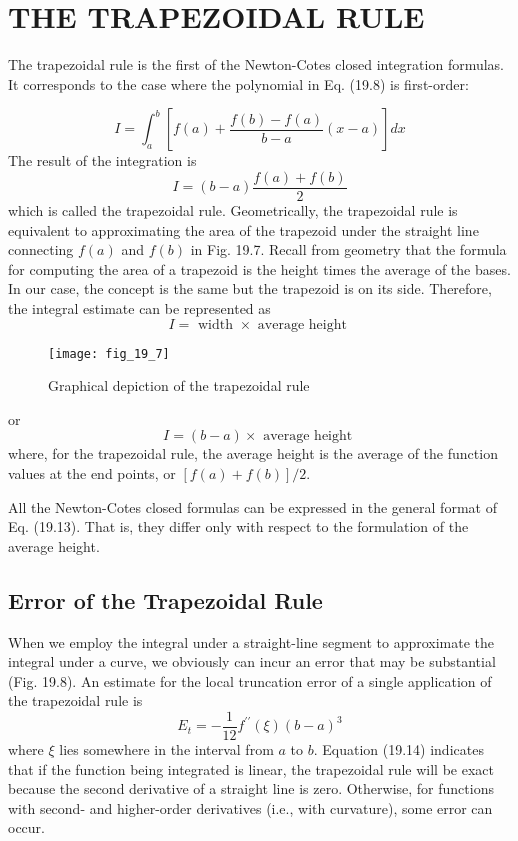 \documentclass[../main.tex]{subfiles}
\begin{document}
\section{THE TRAPEZOIDAL RULE}

The trapezoidal rule is the first of the Newton-Cotes closed integration formulas. It corresponds to the case where the polynomial in Eq. (19.8) is first-order:

\begin{equation}
    \tag{19.10}
I=\int_{a}^{b}\left[f(a)+\frac{f(b)-f(a)}{b-a}(x-a)\right] d x
\end{equation}
The result of the integration is
\begin{equation}
    \tag{19.11}
I=(b-a) \frac{f(a)+f(b)}{2}
\end{equation}
which is called the trapezoidal rule.
Geometrically, the trapezoidal rule is equivalent to approximating the area of the trapezoid under the straight line connecting $f(a)$ and $f(b)$ in Fig. 19.7. Recall from geometry that the formula for computing the area of a trapezoid is the height times the average of the bases. In our case, the concept is the same but the trapezoid is on its side. Therefore, the integral estimate can be represented as
\begin{equation}
    \tag{19.12}
I=\text { width } \times \text { average height }
\end{equation}

\begin{figure}[H]
    \centering
    \texttt{[image: fig\_19\_7]}
   \caption{\textsf{Graphical depiction of the trapezoidal rule}}\label{fig:fig_19_7}
\end{figure}
or
\begin{equation}
    \tag{19.13}
	I=(b-a) \times \text { average height }
\end{equation}
where, for the trapezoidal rule, the average height is the average of the function values at the end points, or $[f(a)+f(b)] / 2$.

All the Newton-Cotes closed formulas can be expressed in the general format of Eq. (19.13). That is, they differ only with respect to the formulation of the average height.
\subsection{Error of the Trapezoidal Rule}
When we employ the integral under a straight-line segment to approximate the integral under a curve, we obviously can incur an error that may be substantial (Fig. 19.8). An estimate for the local truncation error of a single application of the trapezoidal rule is
\begin{equation}
    \tag{19.14}
E_{t}=-\frac{1}{12} f^{\prime \prime}(\xi)(b-a)^{3}
\end{equation}
where $\xi$ lies somewhere in the interval from $a$ to $b$. Equation (19.14) indicates that if the function being integrated is linear, the trapezoidal rule will be exact because the second derivative of a straight line is zero. Otherwise, for functions with second- and higher-order derivatives (i.e., with curvature), some error can occur.
\end{document}
